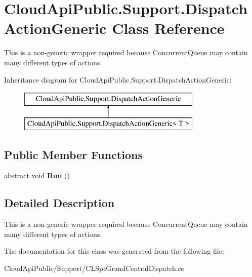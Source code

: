 \hypertarget{class_cloud_api_public_1_1_support_1_1_dispatch_action_generic}{\section{Cloud\-Api\-Public.\-Support.\-Dispatch\-Action\-Generic Class Reference}
\label{class_cloud_api_public_1_1_support_1_1_dispatch_action_generic}
}


This is a non-\/generic wrapper required because Concurrent\-Queue may contain many different types of actions.  


Inheritance diagram for Cloud\-Api\-Public.\-Support.\-Dispatch\-Action\-Generic\-:\begin{figure}[H]
\begin{center}
\leavevmode
\includegraphics[height=2.000000cm]{class_cloud_api_public_1_1_support_1_1_dispatch_action_generic}
\end{center}
\end{figure}
\subsection*{Public Member Functions}
\begin{DoxyCompactItemize}
\item 
\hypertarget{class_cloud_api_public_1_1_support_1_1_dispatch_action_generic_ad02155f9036d5bd645ab646755b267d2}{abstract void {\bfseries Run} ()}\label{class_cloud_api_public_1_1_support_1_1_dispatch_action_generic_ad02155f9036d5bd645ab646755b267d2}

\end{DoxyCompactItemize}


\subsection{Detailed Description}
This is a non-\/generic wrapper required because Concurrent\-Queue may contain many different types of actions. 



The documentation for this class was generated from the following file\-:\begin{DoxyCompactItemize}
\item 
Cloud\-Api\-Public/\-Support/C\-L\-Spt\-Grand\-Central\-Dispatch.\-cs\end{DoxyCompactItemize}
